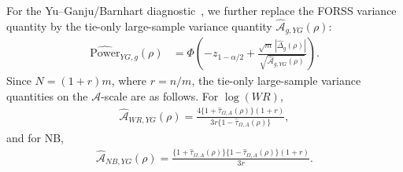 For the Yu--Ganju/Barnhart diagnostic~\cite{yu_sample_2022,barnhart_sample_2025}, we further replace the FORSS variance quantity by the tie-only large-sample variance quantity $\widehat{\mathcal A}_{g,YG}(\rho)$:
\begin{align*}
\widehat{\mathrm{Power}}_{YG,g}(\rho)
&=
\Phi \left(
-z_{1-\alpha/2}
+
\frac{\sqrt{m}\,|\widehat{\Delta}_g(\rho)|}
{\sqrt{\widehat{\mathcal A}_{g,YG}(\rho)}}
\right).
\end{align*}
Since $N=(1+r)m$, where $r=n/m$, the tie-only large-sample variance quantities on the $\mathcal A$-scale are as follows. For $\log(WR)$,
\begin{align*}
\widehat{\mathcal A}_{WR,YG}(\rho)
=
\frac{4\{1+\widehat{\tau}_{\Omega,A}(\rho)\}(1+r)}{3r\{1-\widehat{\tau}_{\Omega,A}(\rho)\}},
\end{align*}
and for NB,
\begin{align*}
\widehat{\mathcal A}_{NB,YG}(\rho)
=
\frac{\{1+\widehat{\tau}_{\Omega,A}(\rho)\}\{1-\widehat{\tau}_{\Omega,A}(\rho)\}(1+r)}{3r}.
\end{align*}

